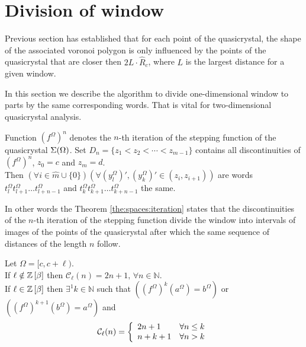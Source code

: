\documentclass[text.tex]{subfiles}
\begin{document}
\section{Division of window}%
Previous section has established that for each point of the quasicrystal, the shape of the associated voronoi polygon is only influenced by the points of the quasicrystal that are closer then $2L\cdot\hat{R}_c$, where $L$ is the largest distance for a given window. 

In this section we describe the algorithm to divide one-dimensional window to parts by the same corresponding words. That is vital for two-dimensional quasicrystal analysis.

\begin{theorem}
\label{the:spaces:iteration}
Function ${(f^\Omega)}^n$ denotes the $n$-th iteration of the stepping function of the quasicrystal $\Sigma(\Omega)$. Set $D_n = \{z_1 < z_2 < \dotsb < z_{m-1}\}$ contains all discontinuities of ${(f^\Omega)}^n$, $z_0 = c$ and $z_m = d$.\\
Then $(\forall i \in \widehat{m}\cup\{0\})(\forall {\left(y_l^\Omega\right)}' ,{\left(y_k^\Omega\right)}' \in (z_i, z_{i+1}))$ are words $t_l^\Omega t_{l+1}^\Omega \dotso t_{l+n-1}^\Omega$ and $t_k^\Omega t_{k+1}^\Omega \dotso t_{k+n-1}^\Omega$ the same.
\end{theorem}

\begin{remark}
In other words the Theorem \ref{the:spaces:iteration} states that the discontinuities of the $n$-th iteration of the stepping function divide the window into intervals of images of the points of the quasicrystal after which the same sequence of distances of the length $n$ follow.
\end{remark}

\begin{theorem}
\label{the:complexity}
Let $\Omega = [c,c+\ell)$.\\
If $\ell \notin \mathbb{Z}\left[\beta\right]$ then $\mathcal{C}_{\ell}(n) = 2n+1,\, \forall n\in\mathbb{N}$. \\
If $\ell \in \mathbb{Z}\left[\beta\right]$ then $\exists^1 k \in \mathbb{N}$ such that $\left({(f^\Omega)}^{k}(a^\Omega) = b^\Omega\right)$ or $\left({(f^\Omega)}^{k+1}(b^\Omega) = a^\Omega\right)$ and 
$$\mathcal{C}_{\ell}(n) = \left\{
	\begin{array}{l l}
		2n+1	&	\forall n\leq k \\
		n+k+1	&	\forall n > k
	\end{array}
	\right.
$$
\end{theorem}
\end{document}
